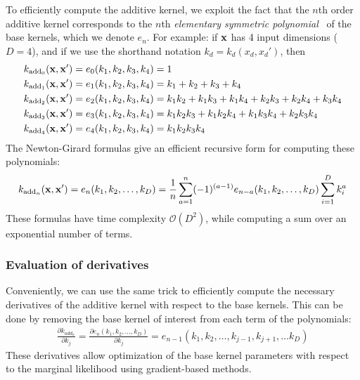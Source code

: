 To efficiently compute the additive kernel, we exploit the fact that the $n$th order additive kernel corresponds to the $n$th \textit{elementary symmetric polynomial}~\citep{macdonald1998symmetric}
of the base kernels, which we denote $e_n$.
For example:  if ${\bf{x}}$ has 4 input dimensions ($D = 4$), and if we use the shorthand notation $k_d = k_d(x_d, x_d')$, then
%
\begin{align}
k_{\textnormal{add}_0}({\bf x, x'}) & = e_0( k_1, k_2, k_3, k_4 ) = 1 \\
k_{\textnormal{add}_1}({\bf x, x'}) & = e_1( k_1, k_2, k_3, k_4 ) = k_1 + k_2 + k_3 + k_4 \\
k_{\textnormal{add}_2}({\bf x, x'}) & = e_2( k_1, k_2, k_3, k_4 ) = k_1 k_2 + k_1 k_3 + k_1k_4 + k_2 k_3 + k_2 k_4 + k_3 k_4 \\
k_{\textnormal{add}_3}({\bf x, x'}) & = e_3( k_1, k_2, k_3, k_4 ) = k_1 k_2 k_3 + k_1 k_2 k_4 + k_1 k_3 k_4 + k_2 k_3 k_4 \\
k_{\textnormal{add}_4}({\bf x, x'}) & = e_4( k_1, k_2, k_3, k_4 ) = k_1 k_2 k_3 k_4
\end{align}
%
The Newton-Girard formulas give an efficient recursive form for computing these polynomials:
%
\begin{align}
k_{\textnormal{add}_n}({\bf x, x'}) = e_n(k_1,k_2,\dots,k_D) = \frac{1}{n} \sum_{a=1}^n (-1)^{(a-1)} e_{n-a}(k_1, k_2, \dots,k_D)  \sum_{i=1}^Dk_i^a
\end{align}
%
These formulas have time complexity $\mathcal{O}( D^2 )$, while computing a sum over an exponential number of terms.


\subsubsection{Evaluation of derivatives}

Conveniently, we can use the same trick to efficiently compute the necessary derivatives of the additive kernel with respect to the base kernels.
This can be done by removing the base kernel of interest from each term of the polynomials:
%
\begin{align}
\frac{\partial k_{add_n}}{\partial k_j} = 
\frac{\partial e_{n}(k_1,k_2,\dots, k_D)}{\partial k_j} = 
e_{n-1}(k_1, k_2, \dots,k_{j-1},k_{j+1}, \dots k_D)
\end{align}
%
These derivatives allow optimization of the base kernel parameters with respect to the marginal likelihood using gradient-based methods.

